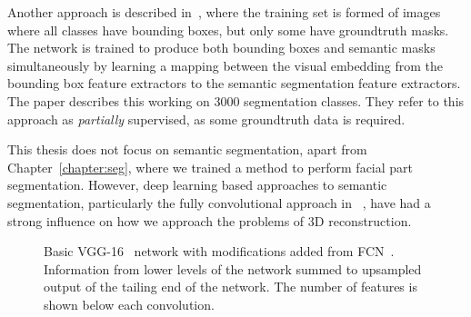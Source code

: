 Another approach is described in~\cite{hu2018learning}, where the
training set is formed of images where all classes have bounding
boxes, but only some have groundtruth masks. The network is trained to
produce both bounding boxes and semantic masks simultaneously by
learning a mapping between the visual embedding from the bounding box
feature extractors to the semantic segmentation feature
extractors. The paper describes this working on 3000 segmentation
classes. They refer to this approach as \textit{partially} supervised,
as some groundtruth data is required.

This thesis does not focus on semantic segmentation, apart from
Chapter~\ref{chapter:seg}, where we trained a method to perform facial
part segmentation. However, deep learning based approaches to semantic
segmentation, particularly the fully convolutional approach in
~\cite{long2015fully}, have had a strong influence on how we approach
the problems of 3D reconstruction.




\begin{figure}
  \centering
\caption[The VGG-16 network]{Basic VGG-16~\cite{simonyan2014vgg}
  network with modifications added from
  FCN~\cite{long2015fully}. Information from lower levels of the
  network summed to upsampled output of the tailing end of the
  network. The number of features is shown below each convolution.}
\label{fig:background:fcn}
\end{figure}











